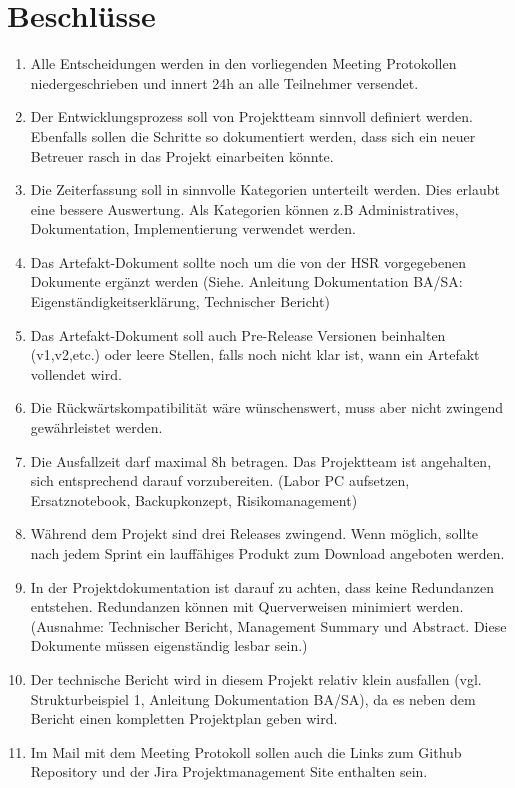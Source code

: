\documentclass[11pt, a4paper,oneside]{scrartcl}
\begin{document}
\section{Beschlüsse}
\begin{enumerate}
	\item Alle Entscheidungen werden in den vorliegenden Meeting Protokollen niedergeschrieben und innert 24h an alle Teilnehmer versendet.
	\item Der Entwicklungsprozess soll von Projektteam sinnvoll definiert werden. Ebenfalls sollen die Schritte so dokumentiert werden, dass sich ein neuer Betreuer rasch in das Projekt einarbeiten könnte.
	\item Die Zeiterfassung soll in sinnvolle Kategorien unterteilt werden. Dies erlaubt eine bessere Auswertung. Als Kategorien können z.B Administratives, Dokumentation, Implementierung verwendet werden.
	\item Das Artefakt-Dokument sollte noch um die von der HSR vorgegebenen Dokumente ergänzt werden (Siehe. Anleitung Dokumentation BA/SA: Eigenständigkeitserklärung, Technischer Bericht)
	\item Das Artefakt-Dokument soll auch Pre-Release Versionen beinhalten (v1,v2,etc.) oder leere Stellen, falls noch nicht klar ist, wann ein Artefakt vollendet wird.
	\item Die Rückwärtskompatibilität wäre wünschenswert, muss aber nicht zwingend gewährleistet werden.
	\item Die Ausfallzeit darf maximal 8h betragen. Das Projektteam ist angehalten, sich entsprechend darauf vorzubereiten. (Labor PC aufsetzen, Ersatznotebook, Backupkonzept, Risikomanagement)
	\item Während dem Projekt sind drei Releases zwingend. Wenn möglich, sollte nach jedem Sprint ein lauffähiges Produkt zum Download angeboten werden. 
	\item In der Projektdokumentation ist darauf zu achten, dass keine Redundanzen entstehen. Redundanzen können mit Querverweisen minimiert werden. (Ausnahme: Technischer Bericht, Management Summary und Abstract. Diese Dokumente müssen eigenständig lesbar sein.)
	\item Der technische Bericht wird in diesem Projekt relativ klein ausfallen (vgl. Strukturbeispiel 1, Anleitung Dokumentation BA/SA), da es neben dem Bericht einen kompletten Projektplan geben wird.
	\item Im Mail mit dem Meeting Protokoll sollen auch die Links zum Github Repository und der Jira Projektmanagement Site enthalten sein.
\end{enumerate}
\end{document}
